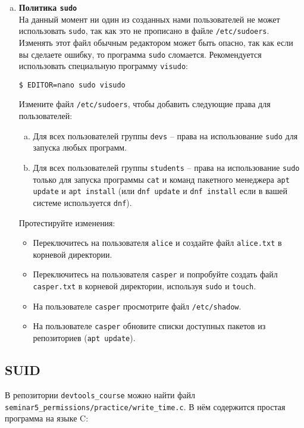 \documentclass{article}
\begin{document}
\begin{enumerate}[a.]
\item \textbf{Политика \texttt{sudo}}\\
На данный момент ни один из созданных нами пользователей не может использовать \texttt{sudo}, так как это не прописано в файле \texttt{/etc/sudoers}. Изменять этот файл обычным редактором может быть опасно, так как если вы сделаете ошибку, то программа \texttt{sudo} сломается. Рекомендуется использовать специальную программу \texttt{visudo}:
\begin{lstlisting}
$ EDITOR=nano sudo visudo
\end{lstlisting}

Измените файл \texttt{/etc/sudoers}, чтобы добавить следующие права для пользователей:
\begin{enumerate}[(a)]
\item Для всех пользователей группы \texttt{devs} -- права на использование \texttt{sudo} для запуска любых программ.
\item Для всех пользователей группы \texttt{students} -- права на использование \texttt{sudo} только для запуска программы \texttt{cat} и команд пакетного менеджера \texttt{apt update} и \texttt{apt install} (или \texttt{dnf update} и \texttt{dnf install} если в вашей системе используется \texttt{dnf}).
\end{enumerate}
Протестируйте изменения:
\begin{itemize}
\item Переключитесь на пользователя \texttt{alice} и создайте файл \texttt{alice.txt} в корневой директории.
\item Переключитесь на пользователя \texttt{casper} и попробуйте создать файл \texttt{casper.txt} в корневой директории, используя \texttt{sudo} и \texttt{touch}.
\item На пользователе \texttt{casper} просмотрите файл \texttt{/etc/shadow}.
\item На пользователе \texttt{casper} обновите списки доступных пакетов из репозиториев (\texttt{apt update}).
\end{itemize}

\end{enumerate}


\subsection{SUID}
В репозитории \texttt{devtools\_course} можно найти файл \texttt{seminar5\_permissions/practice/write\_time.c}. В нём содержится простая программа на языке C:
\end{document}
